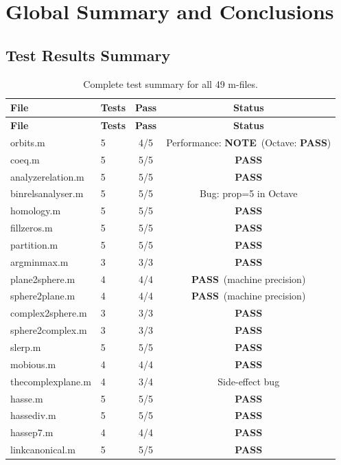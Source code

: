 \documentclass[12pt,a4paper]{report}
\newcommand{\PASS}{\textcolor{green!60!black}{\textbf{PASS}}}
\newcommand{\NOTE}{\textcolor{orange!80!black}{\textbf{NOTE}}}
\begin{document}
\chapter*{Global Summary and Conclusions}

\section*{Test Results Summary}

\begin{longtable}{@{}llcc@{}}
\caption{Complete test summary for all 49 m-files.}\label{tab:summary}\\
\toprule
\textbf{File} & \textbf{Tests} & \textbf{Pass} & \textbf{Status}\\
\midrule\endfirsthead\toprule\textbf{File}&\textbf{Tests}&\textbf{Pass}&\textbf{Status}\\\midrule\endhead\bottomrule\endlastfoot
orbits.m & 5 & 4/5 & Performance: \NOTE\ (Octave: \PASS)\\
coeq.m & 5 & 5/5 & \PASS\\
analyzerelation.m & 5 & 5/5 & \PASS\\
binrelsanalyser.m & 5 & 5/5 & Bug: prop=5 in Octave\\
homology.m & 5 & 5/5 & \PASS\\
fillzeros.m & 5 & 5/5 & \PASS\\
partition.m & 5 & 5/5 & \PASS\\
argminmax.m & 3 & 3/3 & \PASS\\
plane2sphere.m & 4 & 4/4 & \PASS\ (machine precision)\\
sphere2plane.m & 4 & 4/4 & \PASS\ (machine precision)\\
complex2sphere.m & 3 & 3/3 & \PASS\\
sphere2complex.m & 3 & 3/3 & \PASS\\
slerp.m & 5 & 5/5 & \PASS\\
mobious.m & 4 & 4/4 & \PASS\\
thecomplexplane.m & 4 & 3/4 & Side-effect bug\\
hasse.m & 5 & 5/5 & \PASS\\
hassediv.m & 5 & 5/5 & \PASS\\
hassep7.m & 4 & 4/4 & \PASS\\
linkcanonical.m & 5 & 5/5 & \PASS\\

\end{longtable}
\end{document}
